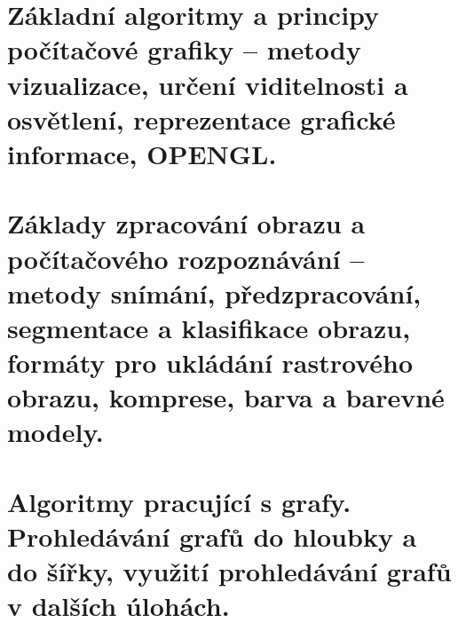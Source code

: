 \section{Základní algoritmy a principy počítačové grafiky  – metody vizualizace, určení viditelnosti a osvětlení, reprezentace grafické informace, OPENGL.}

\section{Základy zpracování obrazu a počítačového rozpoznávání – metody snímání, předzpracování, segmentace a klasifikace obrazu, formáty pro ukládání rastrového obrazu, komprese, barva a barevné modely.}

\section{Algoritmy pracující s grafy. Prohledávání grafů do hloubky a do šířky, využití prohledávání grafů v dalších úlohách.  }